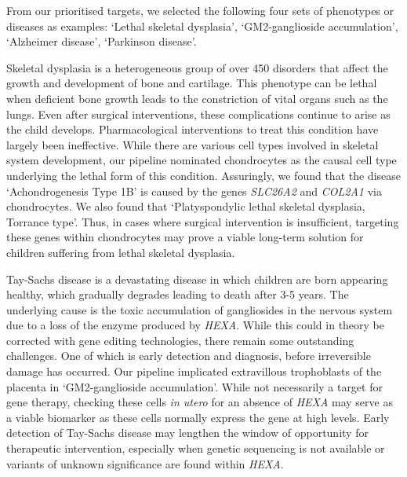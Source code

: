 \documentclass[
sn-nature
]{sn-jnl}
\begin{document}
From our prioritised targets, we selected the following four sets of
phenotypes or diseases as examples: `Lethal skeletal dysplasia',
`GM2-ganglioside accumulation', `Alzheimer disease', `Parkinson
disease'.

Skeletal dysplasia is a heterogeneous group of over 450 disorders that
affect the growth and development of bone and cartilage. This phenotype
can be lethal when deficient bone growth leads to the constriction of
vital organs such as the lungs. Even after surgical interventions, these
complications continue to arise as the child develops. Pharmacological
interventions to treat this condition have largely been ineffective.
While there are various cell types involved in skeletal system
development, our pipeline nominated chondrocytes as the causal cell type
underlying the lethal form of this condition. Assuringly, we found that
the disease `Achondrogenesis Type 1B' is caused by the genes
\emph{SLC26A2} and \emph{COL2A1} via chondrocytes. We also found that
`Platyspondylic lethal skeletal dysplasia, Torrance type'. Thus, in
cases where surgical intervention is insufficient, targeting these genes
within chondrocytes may prove a viable long-term solution for children
suffering from lethal skeletal dysplasia.

Tay-Sachs disease is a devastating disease in which children are born
appearing healthy, which gradually degrades leading to death after 3-5
years. The underlying cause is the toxic accumulation of gangliosides in
the nervous system due to a loss of the enzyme produced by \emph{HEXA}.
While this could in theory be corrected with gene editing technologies,
there remain some outstanding challenges. One of which is early
detection and diagnosis, before irreversible damage has occurred. Our
pipeline implicated extravillous trophoblasts of the placenta in
`GM2-ganglioside accumulation'. While not necessarily a target for gene
therapy, checking these cells \emph{in utero} for an absence of
\emph{HEXA} may serve as a viable biomarker as these cells normally
express the gene at high levels. Early detection of Tay-Sachs disease
may lengthen the window of opportunity for therapeutic intervention,
especially when genetic sequencing is not available or variants of
unknown significance are found within \emph{HEXA}.
\end{document}
